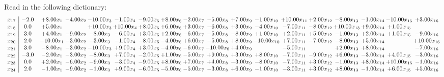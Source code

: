 \documentclass[9pt]{article}
\begin{document}
Read in the following dictionary:
\[\begin{array}{c| c c@{\hskip 2pt} c@{\hskip 2pt} c@{\hskip 2pt} c@{\hskip 2pt} c@{\hskip 2pt} c@{\hskip 2pt} c@{\hskip 2pt} c@{\hskip 2pt} c@{\hskip 2pt} c@{\hskip 2pt} c@{\hskip 2pt} c@{\hskip 2pt} c@{\hskip 2pt} c@{\hskip 2pt} c@{\hskip 2pt} c@{\hskip 2pt} }
 x_{17}   &  -2.0 & +  8.00 x_{1} & -4.00 x_{2} & -10.00 x_{3} & -1.00 x_{4} & -9.00 x_{5} & +  8.00 x_{6} & -2.00 x_{7} & -5.00 x_{8} & +  7.00 x_{9} & -1.00 x_{10} & + 10.00 x_{11} & +  2.00 x_{12} & -8.00 x_{13} & -1.00 x_{14} & -10.00 x_{15} & +  3.00 x_{16}\\
 x_{18}   &  0.0 & +  5.00 x_{1} &   & + 10.00 x_{3} & + 10.00 x_{4} & +  8.00 x_{5} & +  6.00 x_{6} & +  3.00 x_{7} & -6.00 x_{8} & +  3.00 x_{9} & -4.00 x_{10} & -7.00 x_{11} & -8.00 x_{12} & + 10.00 x_{13} & +  9.00 x_{14} & +  1.00 x_{15} &   \\
 x_{19}   &  3.0 & +  4.00 x_{1} & -9.00 x_{2} & -8.00 x_{3} & -6.00 x_{4} & +  3.00 x_{5} & +  2.00 x_{6} & -6.00 x_{7} & -5.00 x_{8} & -8.00 x_{9} & +  1.00 x_{10} & +  2.00 x_{11} & +  5.00 x_{12} & -1.00 x_{13} & +  2.00 x_{14} & +  1.00 x_{15} & -9.00 x_{16}\\
 x_{20}   &  2.0 & -10.00 x_{1} & -3.00 x_{2} & -3.00 x_{3} & -1.00 x_{4} & -8.00 x_{5} & -4.00 x_{6} & +  6.00 x_{7} & -5.00 x_{8} & +  8.00 x_{9} & -10.00 x_{10} & +  7.00 x_{11} & -7.00 x_{12} & -8.00 x_{13} & +  5.00 x_{14} &   & + 10.00 x_{16}\\
 x_{21}   &  3.0 & -8.00 x_{1} & -3.00 x_{2} & -10.00 x_{3} & +  9.00 x_{4} & +  3.00 x_{5} & -4.00 x_{6} & -6.00 x_{7} & -10.00 x_{8} & +  4.00 x_{9} &   & -5.00 x_{11} &   & +  2.00 x_{13} & +  8.00 x_{14} &   & -7.00 x_{16}\\
 x_{22}   &  -3.0 & -2.00 x_{1} & -3.00 x_{2} & -8.00 x_{3} & +  7.00 x_{4} & -2.00 x_{5} & +  1.00 x_{6} & -5.00 x_{7} & +  9.00 x_{8} & +  3.00 x_{9} & +  8.00 x_{10} & -7.00 x_{11} & -9.00 x_{12} & +  6.00 x_{13} & -3.00 x_{14} & +  4.00 x_{15} & -3.00 x_{16}\\
 x_{23}   &  0.0 & +  2.00 x_{1} & -6.00 x_{2} & -9.00 x_{3} & -3.00 x_{4} & -9.00 x_{5} & +  8.00 x_{6} & +  7.00 x_{7} & +  4.00 x_{8} & -3.00 x_{9} & -8.00 x_{10} & -7.00 x_{11} & +  3.00 x_{12} & -1.00 x_{13} & +  8.00 x_{14} & + 10.00 x_{15} & -1.00 x_{16}\\
 x_{24}   &  2.0 & -1.00 x_{1} & -9.00 x_{2} & -1.00 x_{3} & +  9.00 x_{4} & -6.00 x_{5} & -5.00 x_{6} & -5.00 x_{7} & -3.00 x_{8} & +  6.00 x_{9} & -1.00 x_{10} & -3.00 x_{11} & +  3.00 x_{12} & +  8.00 x_{13} & -1.00 x_{14} & +  6.00 x_{15} & +  5.00 x_{16}\\

\end{array}\]
\end{document}

